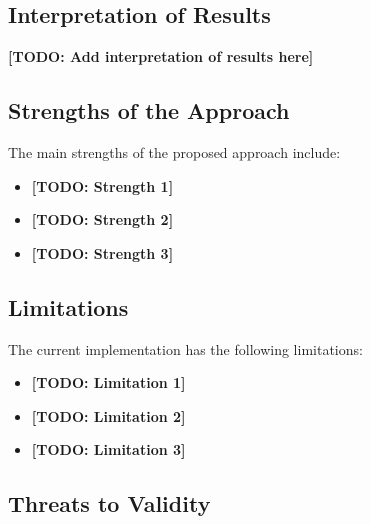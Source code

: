 
\subsection{Interpretation of Results}


\textbf{[TODO: Add interpretation of results here]}

\subsection{Strengths of the Approach}


The main strengths of the proposed approach include:

\begin{itemize}
  \item \textbf{[TODO: Strength 1]}
  \item \textbf{[TODO: Strength 2]}
  \item \textbf{[TODO: Strength 3]}
\end{itemize}

\subsection{Limitations}


The current implementation has the following limitations:

\begin{itemize}
  \item \textbf{[TODO: Limitation 1]}
  \item \textbf{[TODO: Limitation 2]}
  \item \textbf{[TODO: Limitation 3]}
\end{itemize}

\subsection{Threats to Validity}


